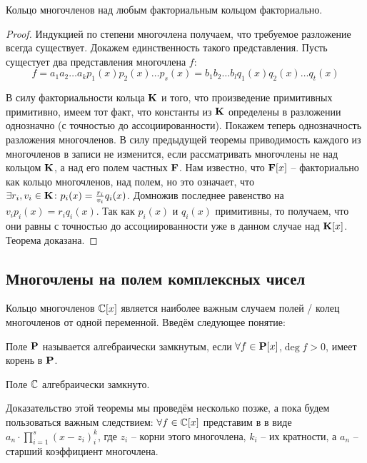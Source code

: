 \begin{theorem}
  Кольцо многочленов над любым факториальным кольцом факториально.
\end{theorem}
\begin{proof}
  Индукцией по степени многочлена получаем, что требуемое разложение всегда существует. Докажем единственность такого представления. Пусть сущестует два представления многочлена $f$:
  $$f=a_1a_2\dots a_k p_1(x)p_2(x)\dots p_s(x)=b_1b_2\dots b_lq_1(x)q_2(x)\dots q_t(x)$$
  
  В силу факториальности кольца $\mathbf{K}$ и того, что произведение примитивных примитивно, имеем тот факт, что константы из $\mathbf{K}$ определены в разложении однозначно (с точностью до ассоциированности). Покажем теперь однозначность разложения многочленов. В силу предыдущей теоремы приводимость каждого из многочленов в записи не изменится, если рассматривать многочлены не над кольцом $\mathbf{K}$, а над его полем частных $\mathbf{F}$. Нам известно, что $\mathbf{F}[x]$ -- факториально как кольцо многочленов, над полем, но это означает, что $\exists r_i,v_i\in\mathbf{K}\colon p_i(x)=\frac{r_i}{v_i}q_i(x)$. Домножив последнее равенство на $v_ip_i(x)=r_iq_i(x)$. Так как $p_i(x)$ и $q_i(x)$ примитивны, то получаем, что они равны с точностью до ассоциированности уже в данном случае над $\mathbf{K}[x]$. Теорема доказана.
\end{proof}

\subsection{Многочлены на полем комплексных чисел}

Кольцо многочленов $\mathbb{C}[x]$ является наиболее важным случаем полей / колец многочленов от одной переменной. Введём следующее понятие:

\begin{df}
  Поле $\mathbf{P}$ называется алгебраически замкнутым, если $\forall f\in\mathbf{P}[x]$,\linebreak $\deg f>0$, имеет корень в $\mathbf{P}$.
\end{df}
\begin{theorem}
  Поле $\mathbb{C}$ алгебраически замкнуто.
\end{theorem}

Доказательство этой теоремы мы проведём несколько позже, а пока будем пользоваться важным следствием: $\forall f\in\mathbb{C}[x]$ представим в в виде $a_n\cdot\prod\limits_{i=1}^s(x-z_i)^k_i$, где $z_i$ -- корни этого многочлена, $k_i$ -- их кратности, а $a_n$ -- старший коэффициент многочлена.

